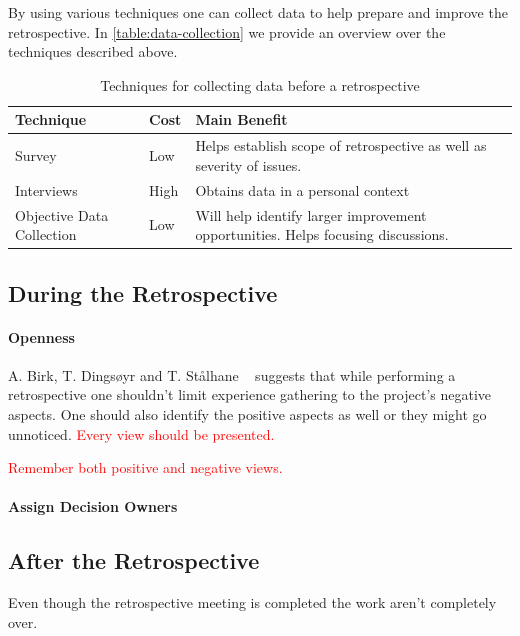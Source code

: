 \documentclass[12pt]{article}
\newcommand\todo[1]{\textcolor{red}{#1}}
\begin{document}
By using various techniques one can collect data to help prepare and improve the retrospective. In \autoref{table:data-collection} we provide an overview over the techniques described above. 

\begin{table}[!h]
	\centering
	\captionsetup{justification=centering}
	\caption{Techniques for collecting data before a retrospective}
	\label{table:data-collection}
	\begin{tabular}{| l | l | p{} |}
		\hline
		Technique & Cost & Main Benefit \\ \hline
		Survey & Low & Helps establish scope of retrospective as well as severity of issues. \\ \hline
		Interviews & High & Obtains data in a personal context \\ \hline
		Objective Data Collection & Low & Will help identify larger improvement opportunities. Helps focusing discussions. \\ \hline
		\hline
	\end{tabular}
\end{table}

\subsection{During the Retrospective}

\paragraph{Openness}
A. Birk, T. Dingsøyr and T. Stålhane ~\cite{Birk2002} suggests that while performing a retrospective one shouldn't limit experience gathering to the project's negative aspects. One should also identify the positive aspects as well or they might go unnoticed. 
\todo{Every view should be presented.}

\todo{Remember both positive and negative views.}

\paragraph{Assign Decision Owners} \label{par:assign-decision-owners}

\subsection{After the Retrospective}
Even though the retrospective meeting is completed the work aren't completely over. 
\end{document}
